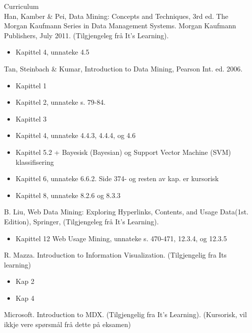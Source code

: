 
{\Huge Curriculum} \\

	Han, Kamber \& Pei, Data Mining: Concepts and Techniques, 3rd ed. The Morgan Kaufmann Series 
	in Data Management Systems. Morgan Kaufmann Publishers, July 2011.
	(Tilgjengeleg frå It’s Learning). 
		\begin{itemize}
			\item Kapittel 4, unnateke 4.5
		\end{itemize} 
	
	Tan, Steinbach \& Kumar, Introduction to Data Mining, Pearson Int. ed. 2006. 
		\begin{itemize}
			\item Kapittel 1 
			\item Kapittel 2, unnateke s. 79-84. 
			\item Kapittel 3 
			\item Kapittel 4, unnateke 4.4.3, 4.4.4, og 4.6 
			\item Kapittel 5.2 + Bayesisk (Bayesian) og Support Vector Machine (SVM) klassifisering
			\item Kapittel 6, unnateke 6.6.2. Side 374- og resten av kap. er kursorisk 
			\item Kapittel 8, unnateke 8.2.6 og 8.3.3 
		\end{itemize}

	B. Liu, Web Data Mining: Exploring Hyperlinks, Contents, and Usage Data(1st. Edition), Springer, 
	(Tilgjengeleg frå It’s Learning). 
		\begin{itemize}
			\item Kapittel 12 Web Usage Mining, unnateke s. 470-471, 12.3.4, og 12.3.5 
		\end{itemize}

	R. Mazza. Introduction to Information Visualization. (Tilgjengelig fra Its learning)
		\begin{itemize}
			\item Kap 2
			\item Kap 4
		\end{itemize}

	Microsoft. Introduction to MDX. (Tilgjengelig fra It's Learning). (Kursorisk, vil ikkje vere spørsmål 
	frå dette på eksamen)
